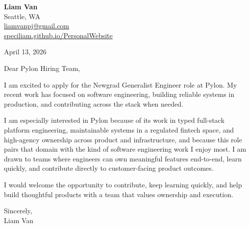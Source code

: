 \documentclass[letterpaper,11pt]{article}
\begin{document}
\begin{flushleft}
\textbf{\Large Liam Van} \\
Seattle, WA \\
\href{mailto:liamvanpj@gmail.com}{liamvanpj@gmail.com} \\
\href{https://speciliam.github.io/PersonalWebsite}{speciliam.github.io/PersonalWebsite}
\end{flushleft}

April 13, 2026

\noindent Dear Pylon Hiring Team,

\noindent I am excited to apply for the Newgrad Generalist Engineer role at Pylon. My recent work has focused on software engineering, building reliable systems in production, and contributing across the stack when needed.

\noindent I am especially interested in Pylon because of its work in typed full-stack platform engineering, maintainable systems in a regulated fintech space, and high-agency ownership across product and infrastructure, and because this role pairs that domain with the kind of software engineering work I enjoy most. I am drawn to teams where engineers can own meaningful features end-to-end, learn quickly, and contribute directly to customer-facing product outcomes.

\noindent I would welcome the opportunity to contribute, keep learning quickly, and help build thoughtful products with a team that values ownership and execution.

\noindent Sincerely, \\
Liam Van
\end{document}
